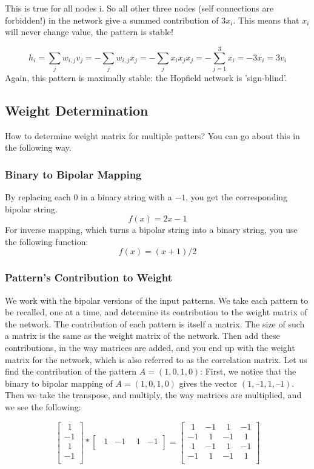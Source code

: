 \documentclass[12pt, right open]{memoir}
\newcommand{\matplus}
{
~~
}
\begin{document}
This is true for all nodes i. So all other three nodes (self connections are
forbidden!) in the network give a summed contribution of $3x_i$. This means that $x_i$ will never change value, the pattern is stable!

\[
h_i = \sum_j w_{i,j}v_j = - \sum_j w_{i,j}x_j = - \sum_j x_ix_jx_j = -\sum^3_{j=1} x_i = −3x_i = 3v_i
\]
Again, this pattern is maximally stable: the Hopfield network is ’sign-blind’.

\subsection{Weight Determination}
How to determine weight matrix for multiple patters? You can go about this in the following way.
\subsubsection{Binary to Bipolar Mapping}
By replacing each $0$ in a binary string with a $-1$, you get the corresponding bipolar string.
\[
f(x) = 2x - 1
\]
For inverse mapping, which turns a bipolar string into a binary string, you use
the following function:
\[
f(x) = (x + 1) / 2
\]
\subsubsection{Pattern’s Contribution to Weight}
We work with the bipolar versions of the input patterns. We take each
pattern to be recalled, one at a time, and determine its contribution to the
weight matrix of the network. The contribution of each pattern is itself a
matrix. The size of such a matrix is the same as the weight matrix of the
network. Then add these contributions, in the way matrices are added, and you
end up with the weight matrix for the network, which is also referred to as the
correlation matrix. Let us find the contribution of the pattern $A = (1, 0, 1, 0)$:
First, we notice that the binary to bipolar mapping of $A = (1, 0, 1, 0)$ gives the
vector $(1, –1, 1, –1)$.
Then we take the transpose, and multiply, the way matrices are multiplied, and
we see the following:

\[ 
\begin{bmatrix}
\matplus1  \\
-1  \\
\matplus1  \\
-1  \\
\end{bmatrix}
*
\begin{bmatrix}
 \matplus1 & -1 & \matplus1 & -1  \\
\end{bmatrix}
=
\begin{bmatrix}
 \matplus1 & -1 &  \matplus1 & -1 \\
-1 &  \matplus1 & -1 &  \matplus1 \\
 \matplus1 & -1 &  \matplus1 & -1 \\
-1 & \matplus1 & -1 &  \matplus1 \\
\end{bmatrix}
\]
\end{document}
